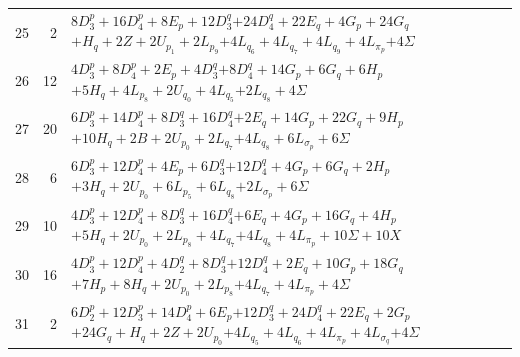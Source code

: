 \documentclass[11pt,a4paper]{article}
\theoremstyle{remark}
\begin{document}
\begin{longtable}{rrp{12.7cm}}
25&2&\( 8D_3^p + 16D_4^p + 8E_p + 12D_3^q \)\newline\( + 24D_4^q + 22E_q + 4G_p + 24G_q \)\newline\( + H_q + 2Z + 2U_{p_{1}} + 2L_{p_{9}} \)\newline\( + 4L_{q_{6}} + 4L_{q_{7}} + 4L_{q_{9}} + 4L_{\pi_p} \)\newline\( + 4\Sigma \)\\[3pt]
26&12&\( 4D_3^p + 8D_4^p + 2E_p + 4D_3^q \)\newline\( + 8D_4^q + 14G_p + 6G_q + 6H_p \)\newline\( + 5H_q + 4L_{p_{8}} + 2U_{q_{0}} + 4L_{q_{5}} \)\newline\( + 2L_{q_{8}} + 4\Sigma \)\\[3pt]
27&20&\( 6D_3^p + 14D_4^p + 8D_3^q + 16D_4^q \)\newline\( + 2E_q + 14G_p + 22G_q + 9H_p \)\newline\( + 10H_q + 2B + 2U_{p_{0}} + 2L_{q_{7}} \)\newline\( + 4L_{q_{8}} + 6L_{\sigma_p} + 6\Sigma \)\\[3pt]
28&6&\( 6D_3^p + 12D_4^p + 4E_p + 6D_3^q \)\newline\( + 12D_4^q + 4G_p + 6G_q + 2H_p \)\newline\( + 3H_q + 2U_{p_{0}} + 6L_{p_{5}} + 6L_{q_{8}} \)\newline\( + 2L_{\sigma_p} + 6\Sigma \)\\[3pt]
29&10&\( 4D_3^p + 12D_4^p + 8D_3^q + 16D_4^q \)\newline\( + 6E_q + 4G_p + 16G_q + 4H_p \)\newline\( + 5H_q + 2U_{p_{0}} + 2L_{p_{8}} + 4L_{q_{7}} \)\newline\( + 4L_{q_{8}} + 4L_{\pi_p} + 10\Sigma + 10X \)\\[3pt]
30&16&\( 4D_3^p + 12D_4^p + 4D_2^q + 8D_3^q \)\newline\( + 12D_4^q + 2E_q + 10G_p + 18G_q \)\newline\( + 7H_p + 8H_q + 2U_{p_{0}} + 2L_{p_{8}} \)\newline\( + 4L_{q_{7}} + 4L_{\pi_p} + 4\Sigma \)\\[3pt]
31&2&\( 6D_2^p + 12D_3^p + 14D_4^p + 6E_p \)\newline\( + 12D_3^q + 24D_4^q + 22E_q + 2G_p \)\newline\( + 24G_q + H_q + 2Z + 2U_{p_{0}} \)\newline\( + 4L_{q_{5}} + 4L_{q_{6}} + 4L_{\pi_p} + 4L_{\sigma_q} \)\newline\( + 4\Sigma \)\\[3pt]

\end{longtable}
\end{document}
